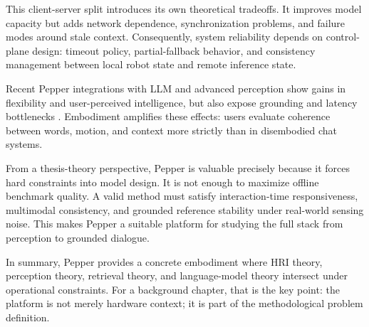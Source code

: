   This client-server split introduces its own theoretical tradeoffs. It improves model capacity but adds network dependence, synchronization problems, and failure modes around stale context.
  Consequently, system reliability depends on control-plane design: timeout policy, partial-fallback behavior, and consistency management between local robot state and remote inference state.

  Recent Pepper integrations with LLM and advanced perception show gains in flexibility and user-perceived intelligence, but also expose grounding and latency bottlenecks
  \cite{latif_physicsassistant_2024,zabala_exploring_2025,wang_target_2024,becerra_improving_2024}. Embodiment amplifies these effects: users evaluate coherence between words, motion, and context more
  strictly than in disembodied chat systems.

  From a thesis-theory perspective, Pepper is valuable precisely because it forces hard constraints into model design. It is not enough to maximize offline benchmark quality. A valid method must satisfy
  interaction-time responsiveness, multimodal consistency, and grounded reference stability under real-world sensing noise. This makes Pepper a suitable platform for studying the full stack from
  perception to grounded dialogue.

  In summary, Pepper provides a concrete embodiment where HRI theory, perception theory, retrieval theory, and language-model theory intersect under operational constraints. For a background chapter,
  that is the key point: the platform is not merely hardware context; it is part of the methodological problem definition.
